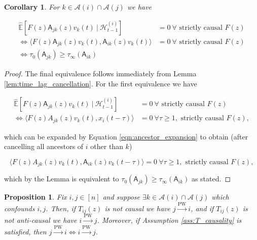 \documentclass{statsoc}
\def\pwgc{\overset{\text{PW}}{\rightarrow}}  %
\def\A{\mathsf{A}}  %
\def\H{\mathcal{H}}  %
\newcommand{\linE}[2]{\hat{\E}[#1\ |\ #2]}  %
\newcommand{\anc}[1]{\mathcal{A}(#1)}  %
\newtheorem{corollary}{Corollary}
\newtheorem{proposition}{Proposition}
\def\H{\mathcal{H}}  %
\def\E{\mathbb{E}}  %
\newcommand{\inner}[2]{\langle #1, #2 \rangle}  %
\begin{document}
\begin{corollary}
  \label{cor:time_lag_cancellation}
  For $k \in \anc{i} \cap \anc{j}$ we have

  \begin{align*}
    \linE{F(z)\A_{jk}(z)v_k(t)}{\H_{t - 1}^{(i)}} &= 0\ \forall \text{ strictly causal } F(z)\\
    \iff \inner{F(z)\A_{jk}(z)v_k(t)}{\A_{ik}(z)v_k(t)} &= 0\ \forall \text{ strictly causal } F(z)\\
    \iff \tau_0(\A_{jk}) \ge \tau_\infty(\A_{ik})
  \end{align*}
\end{corollary}
\begin{proof}
  The final equivalence follows immediately from Lemma \ref{lem:time_lag_cancellation}.  For the first equivalence we have

  \begin{align*}
    \linE{F(z)\A_{jk}(z)v_k(t)}{\H_{t - 1}^{(i)}} &= 0\ \forall \text{ strictly causal } F(z)\\
    \iff \inner{F(z)A_{jk}(z)v_k(t)}{x_i(t - \tau)} &= 0\ \forall \tau \ge 1, \text{ strictly causal } F(z),
  \end{align*}

  which can be expanded by Equation \eqref{eqn:ancestor_expansion} to
  obtain (after cancelling all ancestors of $i$ other than $k$)

  \begin{equation*}
    \inner{F(z)A_{jk}(z)v_k(t)}{\A_{ik}(z)v_k(t - \tau)} = 0\ \forall \tau \ge 1, \text{ strictly causal } F(z),
  \end{equation*}

  which by the Lemma is equivalent to $\tau_0(\A_{jk}) \ge \tau_\infty(\A_{ik})$ as stated.
\end{proof}

\begin{proposition}
  \label{prop:persistence_converse}
  Fix $i, j \in [n]$ and suppose $\exists k \in \anc{i} \cap \anc{j}$
  which confounds $i, j$.  Then, if $T_{ij}(z)$ is not causal we have
  $j \pwgc i$, and if $T_{ij}(z)$ is not anti-causal we have
  $i \pwgc j$.  Moreover, if Assumption \ref{ass:T_causality} is
  satisfied, then $j \pwgc i \iff i \pwgc j$.
\end{proposition}
\end{document}
